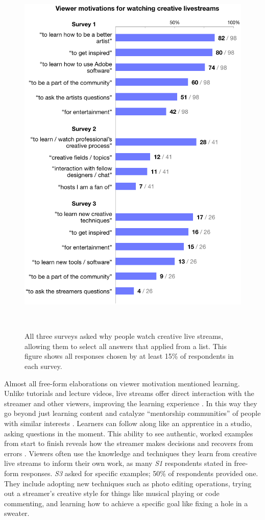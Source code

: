 \begin{figure}[b!]
\centering
  \includegraphics[width=0.7\columnwidth]{liveclips/figures/survey_responses.png}
  \caption{All three surveys asked why people watch creative live streams, allowing them to select all answers that applied from a list. This figure shows all responses chosen by at least 15\% of respondents in each survey. }~\label{fig:livestream_survey_responses}
\vspace{-0.15in}
\end{figure}

Almost all free-form elaborations on viewer motivation mentioned learning. Unlike tutorials and lecture videos, live streams offer direct interaction with the streamer and other viewers, improving the learning experience \cite{Lu2019, Faas2018}. In this way they go beyond just learning content and catalyze ``mentorship communities'' of people with similar interests \cite{Faas2018}. Learners can follow along like an apprentice in a studio, asking questions in the moment. This ability to see authentic, worked examples from start to finish reveals how the streamer makes decisions and recovers from errors \cite{Faas2018}. Viewers often use the knowledge and techniques they learn from creative live streams to inform their own work, as many \textit{S1} respondents stated in free-form responses. \textit{S3} asked for specific examples; 50\% of respondents provided one. They include adopting new techniques such as photo editing operations, trying out a streamer's creative style for things like musical playing or code commenting, and learning how to achieve a specific goal like fixing a hole in a sweater.


